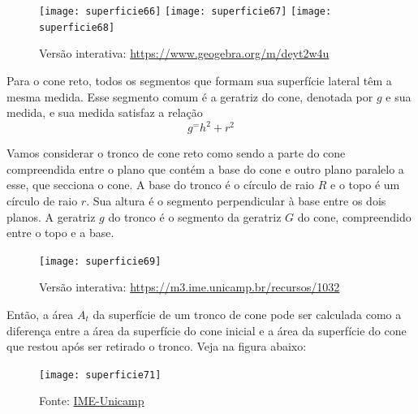 \begin{figure}[H]
\centering

\texttt{[image: superficie66]}\hspace{.5em}
\texttt{[image: superficie67]}\hspace{.5em}
\texttt{[image: superficie68]}

\caption{Versão interativa: \url{https://www.geogebra.org/m/deyt2w4u}}
\end{figure}

Para o cone reto, todos os segmentos que formam sua superfície lateral têm a mesma medida. Esse segmento comum é a geratriz do cone, denotada por $g$ e sua medida, e sua medida satisfaz a relação 
\begin{equation*}
g^=h^2+r^2
\end{equation*}

Vamos considerar o tronco de cone reto como sendo a parte do cone compreendida entre o plano que contém a base do cone e outro plano paralelo a esse, que secciona o cone. A base do tronco é o círculo de raio $R$ e o topo é um círculo de raio $r$. Sua altura é o segmento perpendicular à base entre os dois planos. A geratriz $g$ do tronco é o segmento da geratriz $G$ do cone, compreendido entre o topo e a base.
\begin{figure}[H]
\centering

\texttt{[image: superficie69]}

\caption{Versão interativa: \url{https://m3.ime.unicamp.br/recursos/1032}}
\end{figure}

Então, a área $A_t$ da superfície de um tronco de cone pode ser calculada como a diferença entre a área da superfície do cone inicial e a área da superfície do cone que restou após ser retirado o tronco. Veja na figura abaixo:

\begin{figure}[H]
\centering

\texttt{[image: superficie71]}

\caption{Fonte: \href{https://m3.ime.unicamp.br/recursos/1032}{IME-Unicamp}}
\end{figure}



